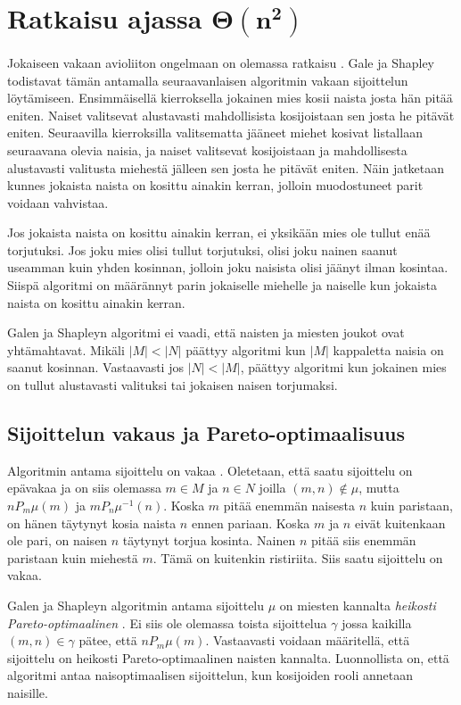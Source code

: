\documentclass[gradu, twoside]{tktltiki}
\begin{document}
\section{Ratkaisu ajassa $\boldsymbol{\Theta(n^2)}$}

Jokaiseen vakaan avioliiton ongelmaan on olemassa ratkaisu
\cite{galeshapley62}. Gale ja Shapley todistavat tämän antamalla
seuraavanlaisen algoritmin vakaan sijoittelun löytämiseen.
Ensimmäisellä kierroksella jokainen mies kosii naista josta hän pitää
eniten. Naiset valitsevat alustavasti mahdollisista kosijoistaan sen
josta he pitävät eniten. Seuraavilla kierroksilla valitsematta jääneet
miehet kosivat listallaan seuraavana olevia naisia, ja naiset
valitsevat kosijoistaan ja mahdollisesta alustavasti valitusta
miehestä jälleen sen josta he pitävät eniten. Näin jatketaan kunnes
jokaista naista on kosittu ainakin kerran, jolloin muodostuneet parit
voidaan vahvistaa.

Jos jokaista naista on kosittu ainakin kerran, ei yksikään mies ole
tullut enää torjutuksi. Jos joku mies olisi tullut torjutuksi, olisi
joku nainen saanut useamman kuin yhden kosinnan, jolloin joku naisista
olisi jäänyt ilman kosintaa. Siispä algoritmi on määrännyt parin
jokaiselle miehelle ja naiselle kun jokaista naista on kosittu ainakin
kerran.

Galen ja Shapleyn algoritmi ei vaadi, että naisten ja miesten joukot
ovat yhtämahtavat. Mikäli $|M| < |N|$ päättyy algoritmi kun $|M|$
kappaletta naisia on saanut kosinnan. Vastaavasti jos $|N| < |M|$,
päättyy algoritmi kun jokainen mies on tullut alustavasti valituksi
tai jokaisen naisen torjumaksi. \cite{galeshapley62}

\subsection{Sijoittelun vakaus ja Pareto-optimaalisuus}

Algoritmin antama sijoittelu on vakaa \cite{galeshapley62}. Oletetaan,
että saatu sijoittelu on epävakaa ja on siis olemassa $m \in M$ ja $n
\in N$ joilla $(m, n) \notin \mu$, mutta $nP_m\mu(m)$ ja
$mP_n\mu^{-1}(n)$. Koska $m$ pitää enemmän naisesta $n$ kuin
paristaan, on hänen täytynyt kosia naista $n$ ennen pariaan. Koska $m$
ja $n$ eivät kuitenkaan ole pari, on naisen $n$ täytynyt torjua
kosinta. Nainen $n$ pitää siis enemmän paristaan kuin miehestä $m$.
Tämä on kuitenkin ristiriita. Siis saatu sijoittelu on vakaa.

Galen ja Shapleyn algoritmin antama sijoittelu $\mu$ on miesten
kannalta \emph{heikosti Pareto-optimaalinen} \cite[sivu
  13]{gusfield89}. Ei siis ole olemassa toista sijoittelua $\gamma$
jossa kaikilla $(m, n) \in \gamma$ pätee, että $nP_m\mu(m)$.
Vastaavasti voidaan määritellä, että sijoittelu on heikosti
Pareto-optimaalinen naisten kannalta. Luonnollista on, että algoritmi
antaa naisoptimaalisen sijoittelun, kun kosijoiden rooli annetaan
naisille.
\end{document}
